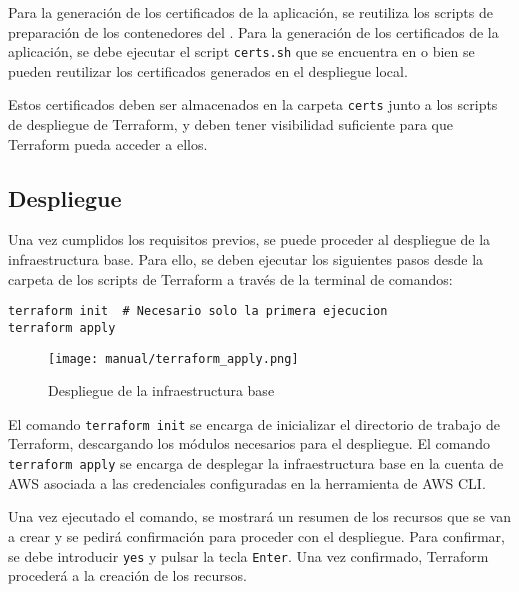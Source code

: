 Para la generación de los certificados de la aplicación, se reutiliza los
scripts de preparación de los contenedores del .
Para la generación de los certificados de la aplicación, se debe ejecutar
el script \texttt{certs.sh} que se encuentra en  o
bien se pueden reutilizar los certificados generados en el despliegue local.

Estos certificados deben ser almacenados en la carpeta \texttt{certs} junto a
los scripts de despliegue de Terraform, y deben tener visibilidad suficiente
para que Terraform pueda acceder a ellos.


\subsection{Despliegue}
Una vez cumplidos los requisitos previos, se puede proceder al despliegue de
la infraestructura base. Para ello, se deben ejecutar los siguientes pasos desde
la carpeta de los scripts de Terraform a través de la terminal de comandos:

\begin{lstlisting}
terraform init  # Necesario solo la primera ejecucion
terraform apply
\end{lstlisting}

\begin{figure}[H]
	\centering
	\texttt{[image: manual/terraform\_apply.png]}
	\caption{Despliegue de la infraestructura base}
	\label{fig:terraform_apply}
\end{figure}

El comando \texttt{terraform init} se encarga de inicializar el directorio de
trabajo de Terraform, descargando los módulos necesarios para el despliegue.
El comando \texttt{terraform apply} se encarga de desplegar la infraestructura
base en la cuenta de AWS asociada a las credenciales configuradas en la
herramienta de AWS CLI.

Una vez ejecutado el comando, se mostrará un resumen de los recursos que se
van a crear y se pedirá confirmación para proceder con el despliegue. Para
confirmar, se debe introducir \texttt{yes} y pulsar la tecla \texttt{Enter}.
Una vez confirmado, Terraform procederá a la creación de los recursos.
